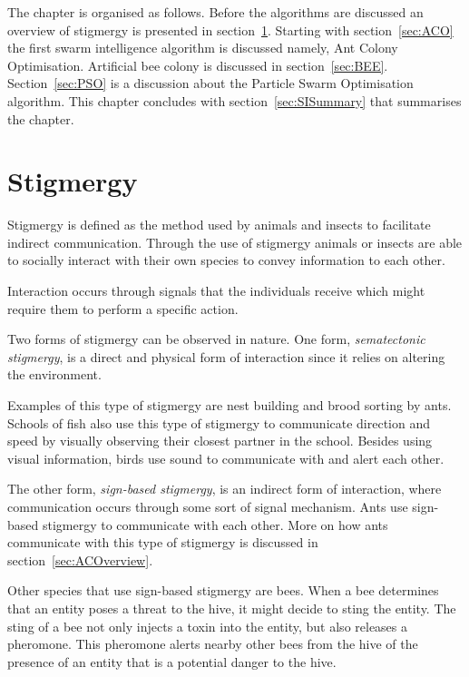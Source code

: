 The chapter is organised as follows. Before the algorithms are discussed an overview of stigmergy is presented in section~\ref{sec:stigmergy}. Starting with section~\ref{sec:ACO} the first swarm intelligence algorithm is discussed namely, Ant Colony Optimisation. Artificial bee colony is discussed in section~\ref{sec:BEE}. Section~\ref{sec:PSO} is a discussion about the Particle Swarm Optimisation algorithm. This chapter concludes with section~\ref{sec:SISummary} that summarises the chapter.

\section{Stigmergy}
\label{sec:stigmergy}
Stigmergy is defined as the method used by animals and insects to facilitate indirect communication\cite{CompuIntelligenceIntro,AntIntroTrends}. Through the use of stigmergy animals or insects are able to socially interact with their own species to convey information to each other\cite{AntsAndStigmergy,FundamentalSwarm}.

Interaction occurs through signals that the individuals receive which might require them to perform a specific action\cite{AntsAndStigmergy,CompuIntelligenceIntro,AntIntroTrends}.

Two forms of stigmergy can be observed in nature. One form, \emph{sematectonic stigmergy}\label{def:sematectonic}, is a direct and physical form of interaction since it relies on altering the environment\cite{CompuIntelligenceIntro}. 

Examples of this type of stigmergy are nest building and brood sorting by ants\cite{CompuIntelligenceIntro}. Schools of fish also use this type of stigmergy to communicate direction and speed by visually observing their closest partner in the school. Besides using visual information, birds use sound to communicate with and alert each other\cite{SwarmArt}.

The other form, \emph{sign-based stigmergy}, is an indirect form of interaction, where communication occurs through some sort of signal mechanism\cite{CompuIntelligenceIntro}. Ants use sign-based stigmergy to communicate with each other. More on how ants communicate with this type of stigmergy is discussed in section~\ref{sec:ACOverview}.

Other species that use sign-based stigmergy are bees\cite{stigmergicoptimization}. When a bee determines that an entity poses a threat to the hive, it might decide to sting the entity. The sting of a bee not only injects a toxin into the entity, but also releases a pheromone\cite{stigmergicoptimization}. This pheromone alerts nearby other bees from the hive of the presence of an entity that is a potential danger to the hive\cite{stigmergicoptimization}. 

